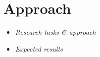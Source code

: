 \section{Approach}
\label{sec:Approach}

\begin{itemize}
	\item \emph{Research tasks \& approach}
	\item \emph{Expected results}
\end{itemize}
